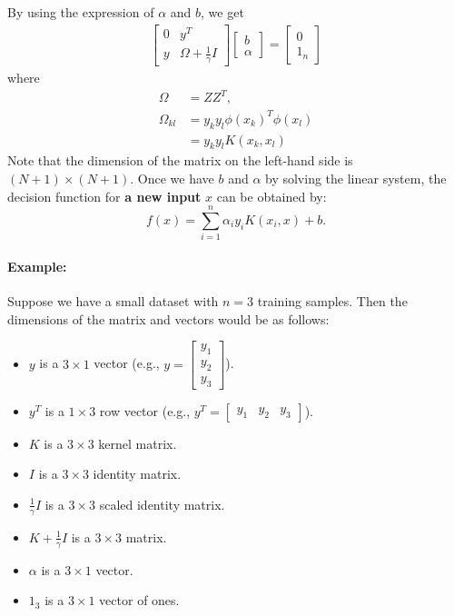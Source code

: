 By using the expression of $\alpha$ and $b$, we get
\begin{align*}
	\begin{bmatrix}
	0 & y^T \\
	y & \Omega + \frac{1}{\gamma} I
	\end{bmatrix}
	\begin{bmatrix}
	b \\
	\alpha
	\end{bmatrix}
	=
	\begin{bmatrix}
	0 \\
	1_n
	\end{bmatrix}
\end{align*}
where 
\begin{align*}
	\Omega &= ZZ^T,\\  
	\Omega_{kl}&= y_ky_l\phi(x_k)^T\phi(x_l)\\ 
			   &= y_ky_lK(x_k, x_l)
\end{align*}
Note that the dimension of the matrix on the left-hand side is $(N+1)\times (N+1)$. Once we have \( b \) and \( \alpha \) by solving the linear system, the decision function for \textbf{a new input} \( x \) can be obtained by:
\[
f(x) = \sum_{i=1}^n \alpha_i y_i K(x_i, x) + b.
\]
\paragraph{Example: }Suppose we have a small dataset with \( n = 3 \) training samples. Then the dimensions of the matrix and vectors would be as follows:
\begin{itemize}
	\item \( y \) is a \( 3 \times 1 \) vector (e.g., \( y = \begin{bmatrix} y_1 \\ y_2 \\ y_3 \end{bmatrix} \)).
	\item \( y^T \) is a \( 1 \times 3 \) row vector (e.g., \( y^T = \begin{bmatrix} y_1 & y_2 & y_3 \end{bmatrix} \)).
	\item \( K \) is a \( 3 \times 3 \) kernel matrix.
	\item \( I \) is a \( 3 \times 3 \) identity matrix.
	\item \( \frac{1}{\gamma} I \) is a \( 3 \times 3 \) scaled identity matrix.
	\item \( K + \frac{1}{\gamma} I \) is a \( 3 \times 3 \) matrix.
	\item \( \alpha \) is a \( 3 \times 1 \) vector.
	\item \( 1_3 \) is a \( 3 \times 1 \) vector of ones.
\end{itemize}


